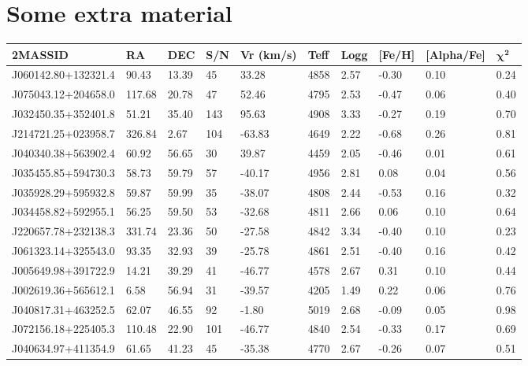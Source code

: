\documentclass[a4paper,fleqn,usenatbib]{mnras}
\begin{document}
\section{Some extra material}
\begin{table}
\centering
\begin{tabular}{llllllllll}
\hline
\textbf{2MASSID} & \textbf{RA} & \textbf{DEC} & \textbf{S/N} & \textbf{Vr (km/s)} & \textbf{Teff} & \textbf{Logg} & \textbf{[Fe/H]} & \textbf{[Alpha/Fe]} & {$\boldsymbol \chi^\textbf{2}$} \\ \hline
J060142.80+132321.4 & 90.43 & 13.39 & 45 & 33.28 & 4858 & 2.57 & -0.30 & 0.10 & 0.24 \\ \hline
J075043.12+204658.0 & 117.68 & 20.78 & 47 & 52.46 & 4795 & 2.53 & -0.47 & 0.06 & 0.40 \\ \hline
J032450.35+352401.8 & 51.21 & 35.40 & 143 & 95.63 & 4908 & 3.33 & -0.27 & 0.19 & 0.70 \\ \hline
J214721.25+023958.7 & 326.84 & 2.67 & 104 & -63.83 & 4649 & 2.22 & -0.68 & 0.26 & 0.81 \\ \hline
J040340.38+563902.4 & 60.92 & 56.65 & 30 & 39.87 & 4459 & 2.05 & -0.46 & 0.01 & 0.61 \\ \hline
J035455.85+594730.3 & 58.73 & 59.79 & 57 & -40.17 & 4956 & 2.81 & 0.08 & 0.04 & 0.56 \\ \hline
J035928.29+595932.8 & 59.87 & 59.99 & 35 & -38.07 & 4808 & 2.44 & -0.53 & 0.16 & 0.32 \\ \hline
J034458.82+592955.1 & 56.25 & 59.50 & 53 & -32.68 & 4811 & 2.66 & 0.06 & 0.10 & 0.64 \\ \hline
J220657.78+232138.3 & 331.74 & 23.36 & 50 & -27.58 & 4842 & 3.34 & -0.40 & 0.10 & 0.23 \\ \hline
J061323.14+325543.0 & 93.35 & 32.93 & 39 & -25.78 & 4861 & 2.51 & -0.40 & 0.16 & 0.42 \\ \hline
J005649.98+391722.9 & 14.21 & 39.29 & 41 & -46.77 & 4578 & 2.67 & 0.31 & 0.10 & 0.44 \\ \hline
J002619.36+565612.1 & 6.58 & 56.94 & 31 & -39.57 & 4205 & 1.49 & 0.22 & 0.06 & 0.76 \\ \hline
J040817.31+463252.5 & 62.07 & 46.55 & 92 & -1.80 & 5019 & 2.68 & -0.09 & 0.05 & 0.98 \\ \hline
J072156.18+225405.3 & 110.48 & 22.90 & 101 & -46.77 & 4840 & 2.54 & -0.33 & 0.17 & 0.69 \\ \hline
J040634.97+411354.9 & 61.65 & 41.23 & 45 & -35.38 & 4770 & 2.67 & -0.26 & 0.07 & 0.51 \\ \hline

\end{tabular}
\end{table}
\end{document}

